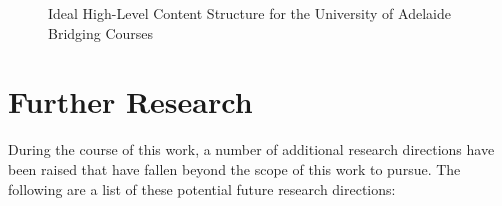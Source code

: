 \documentclass[twoside,12pt,a4paper]{report}
\begin{document}
\begin{figure}
\begin{center}
\end{center}
\caption{Ideal High-Level Content Structure for the University of Adelaide Bridging Courses \label{fig:contentStructure}}
\end{figure}






\section{Further Research}

During the course of this work, a number of additional research directions have been raised that have fallen beyond the scope of this work to pursue. The following are a list of these potential future research directions:
\end{document}
